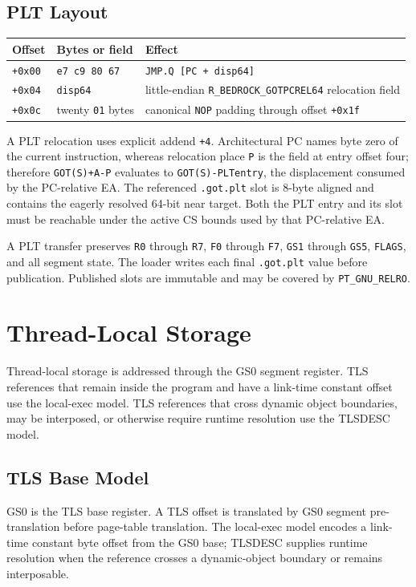 \documentclass[10pt,twoside]{article}
\begin{document}
\subsection{PLT Layout}
\begingroup\footnotesize
\setlength{\tabcolsep}{2pt}
\begin{longtable}{@{}p{0.75in}p{1.55in}p{3.20in}@{}}
\toprule
\textbf{Offset} & \textbf{Bytes or field} & \textbf{Effect}\\
\midrule
\endhead
\texttt{+0x00} & \texttt{e7 c9 80 67} & \texttt{JMP.Q [PC + disp64]}\\
\texttt{+0x04} & \texttt{disp64} & little-endian \texttt{R\_BEDROCK\_GOTPCREL64} relocation field\\
\texttt{+0x0c} & twenty \texttt{01} bytes & canonical \texttt{NOP} padding through offset \texttt{+0x1f}\\
\bottomrule
\end{longtable}
\endgroup

A PLT relocation uses explicit addend \texttt{+4}. Architectural PC names byte zero of the current instruction,
whereas relocation place \texttt{P} is the field at entry offset four; therefore
\texttt{GOT(S)+A-P} evaluates to \texttt{GOT(S)-PLTentry}, the displacement consumed by the PC-relative EA. The
referenced \texttt{.got.plt} slot is 8-byte aligned and contains the eagerly resolved 64-bit near target. Both the
PLT entry and its slot must be reachable under the active CS bounds used by that PC-relative EA.

A PLT transfer preserves \texttt{R0} through \texttt{R7}, \texttt{F0} through
\texttt{F7}, \texttt{GS1} through \texttt{GS5}, \texttt{FLAGS}, and all
segment state. The loader writes each final \texttt{.got.plt} value before
publication. Published slots are immutable and may be covered by
\texttt{PT\_GNU\_RELRO}.
\clearpage
\section{Thread-Local Storage}\label{page:thread-local-storage}
Thread-local storage is addressed through the GS0 segment register. TLS references that remain inside the program and have a link-time constant offset use the local-exec model. TLS references that cross dynamic object boundaries, may be interposed, or otherwise require runtime resolution use the TLSDESC model.
\subsection{TLS Base Model}
GS0 is the TLS base register. A TLS offset is translated by GS0 segment
pre-translation before page-table translation. The local-exec model encodes a
link-time constant byte offset from the GS0 base; TLSDESC supplies runtime
resolution when the reference crosses a dynamic-object boundary or remains
interposable.
\end{document}
